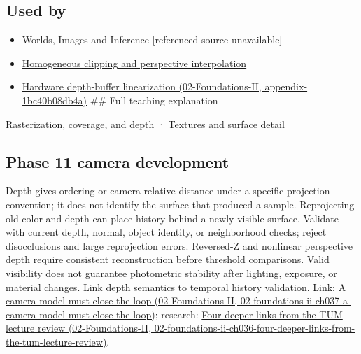 \subsection{Used by}\label{appendix-97578ed97952-used-by}

\begin{itemize}
\item
  {Worlds, Images and Inference {[}referenced source unavailable{]}}
\item
  \hyperref[appendix-40426e4b2103]{Homogeneous clipping and perspective interpolation}
\item
  \href{../02-Foundations-II/main.pdf\#nameddest=appendix-1bc40b08db4a}{Hardware depth-buffer linearization (02-Foundations-II, appendix-1bc40b08db4a)} \#\# Full teaching explanation
\end{itemize}

\hyperref[03-visual-computing-i-ch012-rasterization-coverage-and-depth]{Rasterization, coverage, and depth} · \hyperref[03-visual-computing-i-ch019-textures-and-surface-detail]{Textures and surface detail}

\subsection{Phase 11 camera development}\label{appendix-97578ed97952-phase-11-camera-development}

Depth gives ordering or camera-relative distance under a specific projection convention; it does not identify the surface that produced a sample. Reprojecting old color and depth can place history behind a newly visible surface. Validate with current depth, normal, object identity, or neighborhood checks; reject disocclusions and large reprojection errors. Reversed-Z and nonlinear perspective depth require consistent reconstruction before threshold comparisons. Valid visibility does not guarantee photometric stability after lighting, exposure, or material changes. Link depth semantics to temporal history validation. Link: \href{../02-Foundations-II/main.pdf\#nameddest=02-foundations-ii-ch037-a-camera-model-must-close-the-loop}{A camera model must close the loop (02-Foundations-II, 02-foundations-ii-ch037-a-camera-model-must-close-the-loop)}; research: \href{../02-Foundations-II/main.pdf\#nameddest=02-foundations-ii-ch036-four-deeper-links-from-the-tum-lecture-review}{Four deeper links from the TUM lecture review (02-Foundations-II, 02-foundations-ii-ch036-four-deeper-links-from-the-tum-lecture-review)}.
